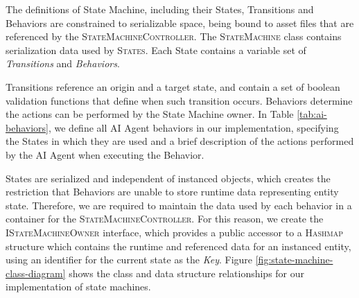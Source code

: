 The definitions of State Machine, including their States, Transitions and Behaviors are constrained to serializable space, being bound to asset files that are referenced by the \textsc{StateMachineController}. The \textsc{StateMachine} class contains serialization data used by \textsc{States}. Each State contains a variable set of \emph{Transitions} and \emph{Behaviors}.

Transitions reference an origin and a target state, and contain a set of boolean validation functions that define when such transition occurs. Behaviors determine the actions can be performed by the State Machine owner. In Table \ref{tab:ai-behaviors}, we define all AI Agent behaviors in our implementation, specifying the States in which they are used and a brief description of the actions performed by the AI Agent when executing the Behavior.



States are serialized and independent of instanced objects, which creates the restriction that Behaviors are unable to store runtime data representing entity state. Therefore, we are required to maintain the data used by each behavior in a container for the \textsc{StateMachineController}. For this reason, we create the \textsc{IStateMachineOwner} interface, which provides a public accessor to a \textsc{Hashmap} structure which contains the runtime and referenced data for an instanced entity, using an identifier for the current state as the \emph{Key}. Figure \ref{fig:state-machine-class-diagram} shows the class and data structure relationships for our implementation of state machines. 

